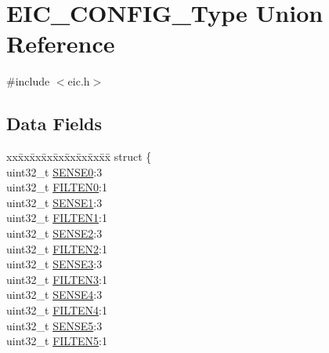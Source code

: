 \hypertarget{union_e_i_c___c_o_n_f_i_g___type}{}\section{E\+I\+C\+\_\+\+C\+O\+N\+F\+I\+G\+\_\+\+Type Union Reference}
\label{union_e_i_c___c_o_n_f_i_g___type}


{\ttfamily \#include $<$eic.\+h$>$}

\subsection*{Data Fields}
\begin{DoxyCompactItemize}
\item 
\begin{tabbing}
xx\=xx\=xx\=xx\=xx\=xx\=xx\=xx\=xx\=\kill
struct \{\\
\>uint32\_t \mbox{\hyperlink{union_e_i_c___c_o_n_f_i_g___type_a9da1ca6d2ac284b5945c398008274a06}{SENSE0}}:3\\
\>uint32\_t \mbox{\hyperlink{union_e_i_c___c_o_n_f_i_g___type_a055b478e24a9b61807ed6d8e173652b9}{FILTEN0}}:1\\
\>uint32\_t \mbox{\hyperlink{union_e_i_c___c_o_n_f_i_g___type_a8b297e46c00410f5b1fcab4788c00333}{SENSE1}}:3\\
\>uint32\_t \mbox{\hyperlink{union_e_i_c___c_o_n_f_i_g___type_a949d5a2ba959bfc7bc597a8779960069}{FILTEN1}}:1\\
\>uint32\_t \mbox{\hyperlink{union_e_i_c___c_o_n_f_i_g___type_af6f2daf64dc651edaa862f7bbc64e52a}{SENSE2}}:3\\
\>uint32\_t \mbox{\hyperlink{union_e_i_c___c_o_n_f_i_g___type_a4d32282addc1c185c11cb188e24ee131}{FILTEN2}}:1\\
\>uint32\_t \mbox{\hyperlink{union_e_i_c___c_o_n_f_i_g___type_ae8faca35320a76e3226e06602c1e3b95}{SENSE3}}:3\\
\>uint32\_t \mbox{\hyperlink{union_e_i_c___c_o_n_f_i_g___type_a9c0cec07e8560ecca7bf66ec1b3019b9}{FILTEN3}}:1\\
\>uint32\_t \mbox{\hyperlink{union_e_i_c___c_o_n_f_i_g___type_af92254967132e09b3b590c099d7605bc}{SENSE4}}:3\\
\>uint32\_t \mbox{\hyperlink{union_e_i_c___c_o_n_f_i_g___type_aedaad5686acf33d58deec79a7bff0e9a}{FILTEN4}}:1\\
\>uint32\_t \mbox{\hyperlink{union_e_i_c___c_o_n_f_i_g___type_a13e6fcc8a7221b0f5160556569b3ecea}{SENSE5}}:3\\
\>uint32\_t \mbox{\hyperlink{union_e_i_c___c_o_n_f_i_g___type_a94d78da2834fcb4db5f4cbd828af762b}{FILTEN5}}:1\\

\end{tabbing}
\end{DoxyCompactItemize}

